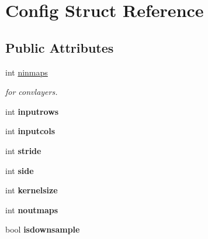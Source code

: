 \hypertarget{struct_config}{\section{Config Struct Reference}
\label{struct_config}
}
\subsection*{Public Attributes}
\begin{DoxyCompactItemize}
\item 
\hypertarget{struct_config_a8482c2a80bd7661adefb7e4af2c8e82f}{int \hyperlink{struct_config_a8482c2a80bd7661adefb7e4af2c8e82f}{ninmaps}}\label{struct_config_a8482c2a80bd7661adefb7e4af2c8e82f}

\begin{DoxyCompactList}\small\item\em for convlayers. \end{DoxyCompactList}\item 
\hypertarget{struct_config_ab7f363b2ca498b13f6e1fe9cb3772c16}{int {\bfseries inputrows}}\label{struct_config_ab7f363b2ca498b13f6e1fe9cb3772c16}

\item 
\hypertarget{struct_config_a236752a83d954c43bd21a0731173eec0}{int {\bfseries inputcols}}\label{struct_config_a236752a83d954c43bd21a0731173eec0}

\item 
\hypertarget{struct_config_ad7a985e951722129907736ae5c092459}{int {\bfseries stride}}\label{struct_config_ad7a985e951722129907736ae5c092459}

\item 
\hypertarget{struct_config_aef9875c26e3c553b843359901a6083a6}{int {\bfseries side}}\label{struct_config_aef9875c26e3c553b843359901a6083a6}

\item 
\hypertarget{struct_config_a39ebc108302ce9a999b45cb6dfb3d386}{int {\bfseries kernelsize}}\label{struct_config_a39ebc108302ce9a999b45cb6dfb3d386}

\item 
\hypertarget{struct_config_ad85769049d1ef3cdca4b31486aa2128e}{int {\bfseries noutmaps}}\label{struct_config_ad85769049d1ef3cdca4b31486aa2128e}

\item 
\hypertarget{struct_config_ae694bea0336597df1a264b6352440abb}{bool {\bfseries isdownsample}}\label{struct_config_ae694bea0336597df1a264b6352440abb}


\end{DoxyCompactItemize}

